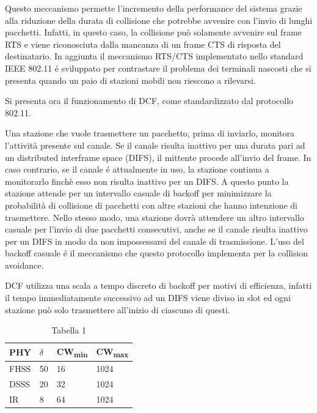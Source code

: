 Questo meccanismo permette l'incremento della performance del sistema grazie alla riduzione della durata di collisione che potrebbe avvenire con l'invio di lunghi pacchetti.
Infatti, in questo caso, la collisione pu\`o solamente avvenire sul frame RTS e viene riconosciuta dalla mancanza di un frame CTS di risposta del destinatario.
In aggiunta il meccanismo RTS/CTS implementato nello standard IEEE 802.11 \'e sviluppato per contrastare il problema dei terminali nascosti \cite{tobagi1975packet} che si presenta quando un paio di stazioni mobili non riescono a rilevarsi. %

Si presenta ora il funzionamento di DCF, come standardizzato dal protocollo 802.11.

Una stazione che vuole trasmettere un pacchetto, prima di inviarlo, monitora l'attivit\`a presente sul canale.
Se il canale risulta inattivo per una durata pari ad un distributed interframe space (DIFS), il mittente procede all'invio del frame.
In caso contrario, se il canale \'e attualmente in uso, la stazione continua a monitorarlo finch\`e esso non risulta inattivo per un DIFS.
A questo punto la stazione attende per un intervallo casuale di backoff per minimizzare la probabilit\`a di collisione di pacchetti con altre stazioni che hanno intenzione di trasmettere.
Nello stesso modo, una stazione dovr\`a attendere un altro intervallo casuale per l'invio di due pacchetti consecutivi, anche se il canale risulta inattivo per un DIFS in modo da non impossessarsi del canale di trasmissione.
L'uso del backoff casuale \'e il meccanismo che questo protocollo implementa per la collision avoidance.

DCF utilizza una scala a tempo discreto di backoff per motivi di efficienza, infatti il tempo immediatamente successivo ad un DIFS viene diviso in slot ed ogni stazione pu\`o solo trasmettere all'inizio di ciascuno di questi.
\begin{table}
\centering
\begin{tabular}{| l | l | l | l |}
	\hline 
	PHY & $\delta$ & CW\textsubscript{min} & CW\textsubscript{max} \\ \hline
	FHSS & 50 & 16 & 1024 \\ \hline
	DSSS & 20 & 32 & 1024 \\ \hline
	IR &8 & 64 & 1024 \\ 
	\hline
\end{tabular}
\caption{Tabella 1}
\label{table:deltavalues}
\end{table}

